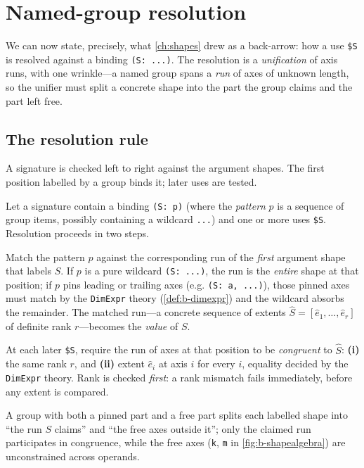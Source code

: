 \section{Named-group resolution}
\label{sec:b-resolve}

We can now state, precisely, what \cref{ch:shapes} drew as a back-arrow: how a use
\lstinline[style=l4style]|$S| is resolved against a binding
\lstinline[style=l4style]|(S: ...)|. The resolution is a \emph{unification} of
axis runs, with one wrinkle---a named group spans a \emph{run} of axes of unknown
length, so the unifier must split a concrete shape into the part the group claims
and the part left free.

\subsection{The resolution rule}
\label{sec:b-resolve-rule}

A signature is checked left to right against the argument shapes. The first
position labelled by a group binds it; later uses are tested.

\begin{definition}
\label{def:b-resolve}
Let a signature contain a binding \lstinline[style=l4style]|(S: p)| (where the
\emph{pattern} $p$ is a sequence of group items, possibly containing a wildcard
\lstinline[style=l4style]|...|) and one or more uses \lstinline[style=l4style]|$S|.
Resolution proceeds in two steps.

\begin{description}[leftmargin=1.6em, style=nextline, nosep]
\item[Bind.] Match the pattern $p$ against the corresponding run of the
\emph{first} argument shape that labels $S$. If $p$ is a pure wildcard
\lstinline[style=l4style]|(S: ...)|, the run is the \emph{entire} shape at that
position; if $p$ pins leading or trailing axes (e.g.
\lstinline[style=l4style]|(S: a, ...)|), those pinned axes must match by the
\lstinline[style=l4style]|DimExpr| theory (\cref{def:b-dimexpr}) and the wildcard
absorbs the remainder. The matched run---a concrete sequence of extents
$\hat{S} = [\hat{e}_1,\dots,\hat{e}_r]$ of definite rank $r$---becomes the
\emph{value} of $S$.
\item[Use.] At each later \lstinline[style=l4style]|$S|, require the run of axes at
that position to be \emph{congruent} to $\hat{S}$: \textbf{(i)} the same rank $r$,
and \textbf{(ii)} extent $\hat{e}_i$ at axis $i$ for every $i$, equality decided by
the \lstinline[style=l4style]|DimExpr| theory. Rank is checked \emph{first}: a rank
mismatch fails immediately, before any extent is compared.
\end{description}

\noindent A group with both a pinned part and a free part splits each labelled
shape into ``the run $S$ claims'' and ``the free axes outside it''; only the
claimed run participates in congruence, while the free axes (\texttt{k},
\texttt{m} in \cref{fig:b-shapealgebra}) are unconstrained across operands.
\end{definition}

